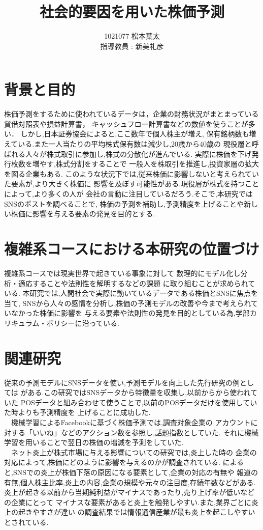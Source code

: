 \documentclass[11pt]{jarticle}
\author{
    1021077 松本葉太\\指導教員 : 新美礼彦
}
\title{社会的要因を用いた株価予測}
\begin{document}
\maketitle

\section{背景と目的}
株価予測をするために使われているデータは，企業の財務状況がまとまっている貸借対照表や損益計算書，
キャッシュフロー計算書などの数値を使うことが多い．
しかし,日本証券協会\cite{syoukengyoukai}によると,ここ数年で個人株主が増え,
保有銘柄数も増えている.また一人当たりの平均株式保有数は減少し,20歳から40歳の
現役層と呼ばれる人々が株式取引に参加し,株式の分散化が進んでいる.
実際に株価を下げ発行枚数を増やす,株式分割をすることで
一般人を株取引を推進し,投資家層の拡大を図る企業もある.
このような状況下では,従来株価に影響しないと考えられていた要素が,より大きく株価に
影響を及ぼす可能性がある.現役層が株式を持つことによって,より多くの人が
会社の言動に注目しているだろう.そこで,本研究ではSNSのポストを調べることで,
株価の予測を補助し,予測精度を上げることや新しい株価に影響を与える要素の発見を目的とする.
\section{複雑系コースにおける本研究の位置づけ}
複雑系コースでは現実世界で起きている事象に対して
数理的にモデル化し分析・適応することや法則性を解明するなどの課題
に取り組むことが求められている\cite{funpolicy}.
本研究では,人間社会で実際に動いているデータである株価とSNSに焦点を当て,
SNSから人々の感情を分析し,株価の予測モデルの改善や今まで考えられていなかった株価に影響を
与える要素や法則性の発見を目的としている為,学部カリキュラム・ポリシー\cite{funpolicy}に沿っている.

\section{関連研究}
従来の予測モデルにSNSデータを使い,予測モデルを向上した先行研究の例としては
\cite{posSNS}がある.この研究ではSNSデータから特徴量を収集し,以前からから使われていた
POSデータと組み合わせて使うことで,以前のPOSデータだけを使用していた時よりも予測精度を
上げることに成功した.\\
　機械学習によるFacebookに基づく株価予測\cite{oikawa}では,調査対象企業の
アカウントに対する「いいね」などのアクション数を参照し,話題指数としていた.
それに機械学習を用いることで翌日の株価の増減を予測をしていた.\\
　ネット炎上が株式市場に与える影響についての研究\cite{enjo}では,炎上した時の
企業の対応によって,株価にどのように影響を与えるのかが調査されている.
\cite{enjo}によると,SNSでの炎上が株価下落の原因になる要素として,企業の対応の有無や
報道の有無,個人株主比率,炎上の内容,企業の規模や元々の注目度,存続年数などがある.
炎上が起きる以前から当期純利益がマイナスであったり,売り上げ率が低いなどの企業にとって
マイナスな要素があると炎上を触発しやすい.また,業界ごとに炎上の起きやすさが違い\cite{enjo}
の調査結果では情報通信産業が最も炎上を起こしやすいとされている.
\end{document}
